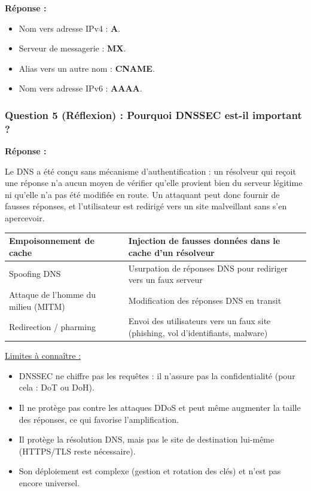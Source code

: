\documentclass[12pt,a4paper]{article}
\newcommand{\reponse}{\textbf{Réponse :}\par}
\begin{document}
\reponse
\begin{itemize}
    \item Nom vers adresse IPv4 : \textbf{A}.
    \item Serveur de messagerie : \textbf{MX}.
    \item Alias vers un autre nom : \textbf{CNAME}.
    \item Nom vers adresse IPv6 : \textbf{AAAA}.
\end{itemize}

\subsubsection*{Question 5 (Réflexion) : Pourquoi DNSSEC est-il important ?}

\reponse
Le DNS a été conçu sans mécanisme d'authentification : un résolveur qui
reçoit une réponse n'a aucun moyen de vérifier qu'elle provient bien du
serveur légitime ni qu'elle n'a pas été modifiée en route. Un attaquant
peut donc fournir de fausses réponses, et l'utilisateur est redirigé
vers un site malveillant sans s'en apercevoir.

\begin{longtable}{|L{4.5cm}|L{10.5cm}|}
\hline
Empoisonnement de cache & Injection de fausses données dans le cache
d'un résolveur \\ \hline
Spoofing DNS & Usurpation de réponses DNS pour rediriger vers un faux
serveur \\ \hline
Attaque de l'homme du milieu (MITM) & Modification des réponses DNS en
transit \\ \hline
Redirection / pharming & Envoi des utilisateurs vers un faux site
(phishing, vol d'identifiants, malware) \\ \hline
\end{longtable}

\underline{Limites à connaître :}
\begin{itemize}
    \item DNSSEC ne chiffre pas les requêtes : il n'assure pas la
    confidentialité (pour cela : DoT ou DoH).
    \item Il ne protège pas contre les attaques DDoS et peut même
    augmenter la taille des réponses, ce qui favorise l'amplification.
    \item Il protège la résolution DNS, mais pas le site de destination
    lui-même (HTTPS/TLS reste nécessaire).
    \item Son déploiement est complexe (gestion et rotation des clés) et
    n'est pas encore universel.
\end{itemize}
\end{document}
